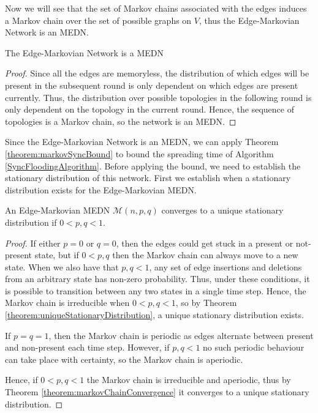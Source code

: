Now we will see that the set of Markov chains associated with the edges induces a Markov chain over the set of possible graphs on $V$, thus the Edge-Markovian Network is an MEDN.


\begin{lemma}
	The Edge-Markovian Network is a MEDN
\end{lemma}

\begin{proof}
	Since all the edges are memoryless, the distribution of which edges will be present in the subsequent round is only dependent on which edges are present currently. %
	Thus, the distribution over possible topologies in the following round is only dependent on the topology in the current round.
	Hence, the sequence of topologies is a Markov chain, so the network is an MEDN.
\end{proof}

Since the Edge-Markovian Network is an MEDN, we can apply Theorem \ref{theorem:markovSyncBound} to bound the spreading time of Algorithm \ref{SyncFloodingAlgorithm}. Before applying the bound, we need to establish the stationary distribution of this network. First we establish when a stationary distribution exists for the Edge-Markovian MEDN.

\begin{lemma}
	An Edge-Markovian MEDN $\mathcal{M}(n, p, q)$ converges to a unique stationary distribution if $0 < p, q < 1$.
\end{lemma}

\begin{proof}
	If either $p=0$ or $q=0$, then the edges could get stuck in a present or not-present state, but if $0 < p, q$ then the Markov chain can always move to a new state. When we also have that $p, q < 1$, any set of edge insertions and deletions from an arbitrary state has non-zero probability. Thus, under these conditions, it is possible to transition between any two states in a single time step. Hence, the Markov chain is irreducible when $0 < p, q < 1$, so by Theorem \ref{theorem:uniqueStationaryDistribution}, a unique stationary distribution exists.

	If $p=q=1$, then the Markov chain is periodic as edges alternate between present and non-present each time step. However, if $p, q < 1$ no such periodic behaviour can take place with certainty, so the Markov chain is aperiodic.

	Hence, if $0 < p, q < 1$ the Markov chain is irreducible and aperiodic, thus by Theorem \ref{theorem:markovChainConvergence}
	it converges to a unique stationary distribution.
\end{proof}

